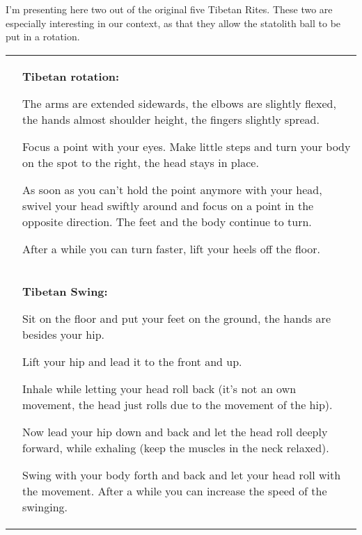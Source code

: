 \documentclass[../main.tex]{subfiles}
\begin{document}
\label{Ex:tibetan}

{I'm presenting here two out of the original five Tibetan Rites. These two are especially interesting in our context, as that they allow the statolith ball to be put in a rotation.}

\vspace{1cm}
\noindent
\begin{tabular}{p{5.4cm} p{6.5cm}}
  \raisebox{-1.4\totalheight}{  \texttt{[image: Tibetan\_rotate]} }
&
\textbf{Tibetan rotation:}


The {arms} are {extended sidewards}, the elbows are slightly flexed, the hands almost shoulder height, the fingers slightly spread. 

{Focus a point} with your eyes. Make little steps and {turn your body} on the spot to the right, the {head stays in place}. 


As soon as you can't hold the point anymore with your head, {swivel your head swiftly} around and focus on a point in the opposite direction. The feet and the body continue to turn.

After a while you can {turn faster}, lift your heels off the floor.


\vspace{2cm}
  \\
  
  \raisebox{-1.4\totalheight}{  \texttt{[image: Tibetan\_swing]} }
&
\textbf{Tibetan Swing:}

Sit on the floor and put your feet on the ground, the hands are besides your hip.

{Lift your hip} and lead it to the front and up.

{Inhale} while letting your {head roll back} (it's not an own movement, the head just rolls due to the movement of the hip).

Now lead your {hip down and back} and let the {head roll deeply forward}, while exhaling (keep the muscles in the neck relaxed).

Swing with your body forth and back and let your head roll with the movement. After a while you can increase the speed of the swinging.
\end{tabular}
\newpage
\end{document}
